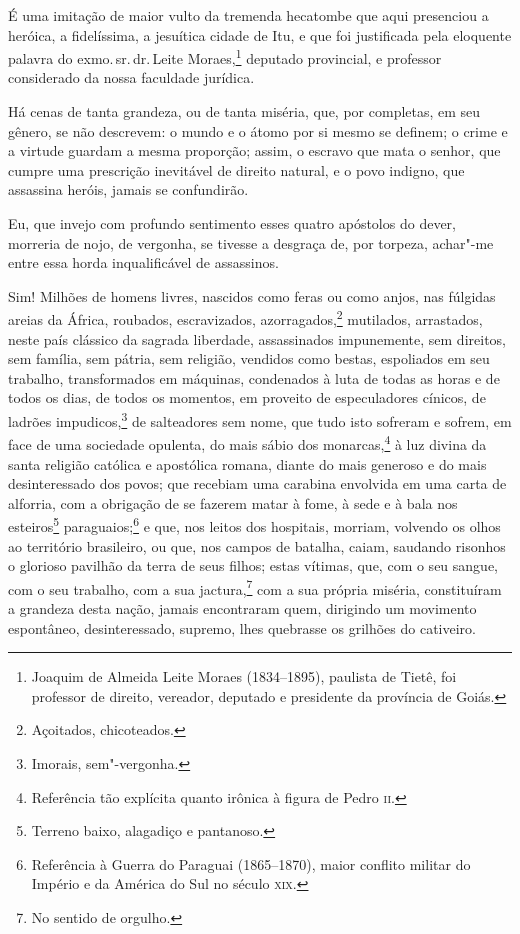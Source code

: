É uma imitação de maior vulto da tremenda hecatombe que aqui presenciou
a heróica, a fidelíssima, a jesuítica cidade de Itu, e que foi
justificada pela eloquente palavra do exmo.\,sr.\,dr.\,Leite
Moraes,\footnote{Joaquim de Almeida Leite Moraes (1834--1895), paulista
  de Tietê, foi professor de direito, vereador, deputado e presidente da
  província de Goiás.} deputado provincial, e professor considerado da
nossa faculdade jurídica.

Há cenas de tanta grandeza, ou de tanta miséria, que, por completas, em
seu gênero, se não descrevem: o mundo e o átomo por si mesmo se definem;
o crime e a virtude guardam a mesma proporção; assim, o escravo que mata
o senhor, que cumpre uma prescrição inevitável de direito natural, e o
povo indigno, que assassina heróis, jamais se confundirão.

Eu, que invejo com profundo sentimento esses quatro apóstolos do dever,
morreria de nojo, de vergonha, se tivesse a desgraça de, por torpeza,
achar"-me entre essa horda inqualificável de assassinos.

Sim! Milhões de homens livres, nascidos como feras ou como anjos, nas
fúlgidas areias da África, roubados, escravizados, azorragados,\footnote{
  Açoitados, chicoteados.} mutilados, arrastados, neste país clássico
da sagrada liberdade, assassinados impunemente, sem direitos, sem
família, sem pátria, sem religião, vendidos como bestas, espoliados em
seu trabalho, transformados em máquinas, condenados à luta de todas as
horas e de todos os dias, de todos os momentos, em proveito de
especuladores cínicos, de ladrões impudicos,\footnote{Imorais,
  sem"-vergonha.} de salteadores sem nome, que tudo isto sofreram e
sofrem, em face de uma sociedade opulenta, do mais sábio dos
monarcas,\footnote{Referência tão explícita quanto irônica à figura de
  Pedro \textsc{ii}.} à luz divina da santa religião católica e apostólica
romana, diante do mais generoso e do mais desinteressado dos povos; que
recebiam uma carabina envolvida em uma carta de alforria, com a
obrigação de se fazerem matar à fome, à sede e à bala nos
esteiros\footnote{Terreno baixo, alagadiço e pantanoso.}
paraguaios;\footnote{Referência à Guerra do Paraguai (1865--1870), maior
  conflito militar do Império e da América do Sul no século \textsc{xix}.} e
que, nos leitos dos hospitais, morriam, volvendo os olhos ao território
brasileiro, ou que, nos campos de batalha, caiam, saudando risonhos o
glorioso pavilhão da terra de seus filhos; estas vítimas, que, com o seu
sangue, com o seu trabalho, com a sua jactura,\footnote{No sentido de
  orgulho.} com a sua própria miséria, constituíram a grandeza desta
nação, jamais encontraram quem, dirigindo um movimento espontâneo,
desinteressado, supremo, lhes quebrasse os grilhões do cativeiro.

